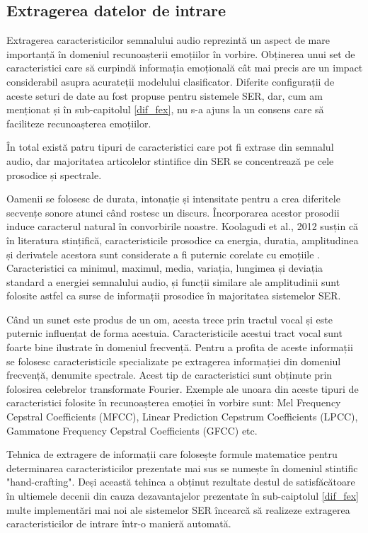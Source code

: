 \documentclass[a4paper,12pt]{book}
\begin{document}
					\subsection{Extragerea datelor de intrare}
						Extragerea caracteristicilor semnalului audio reprezintă un aspect de mare importanță în domeniul recunoașterii emoțiilor în vorbire. Obținerea unui set de caracteristici care să  curpindă informația emoțională cât mai precis are un impact considerabil asupra acurateții modelului clasificator. Diferite configurații de aceste seturi de date au fost propuse pentru sistemele SER, dar, cum am menționat și în sub-capitolul \ref{dif_fex}, nu s-a ajuns la un consens care să faciliteze recunoașterea emoțiilor. \par 
						
						În total există patru tipuri de caracteristici care pot fi extrase din semnalul audio, dar majoritatea articolelor stintifice din SER se concentrează pe cele prosodice și spectrale.\par Oamenii se folosesc de durata, intonație și intensitate pentru a crea diferitele secvențe sonore atunci când rostesc un discurs. Încorporarea acestor prosodii induce caracterul natural în convorbirile noastre. Koolagudi et al., 2012 \cite{koolagudi} susțin că în literatura stințifică, caracteristicile prosodice ca energia, duratia, amplitudinea și derivatele acestora sunt considerate a fi puternic corelate cu emoțiile \cite{dellaert,hcf2,hcf3}. Caracteristici ca minimul, maximul, media, variația, lungimea și deviația standard a energiei semnalului audio, și funcții similare ale amplitudinii sunt folosite astfel ca surse de informații prosodice în majoritatea sistemelor SER. \par Când un sunet este produs de un om, acesta trece prin tractul vocal și este puternic influențat de forma acestuia. Caracteristicile acestui tract vocal sunt foarte bine ilustrate în domeniul frecvență. Pentru a profita de aceste informații se folosesc caracteristicile specializate pe extragerea informației din domeniul frecvență, denumite spectrale. Acest tip de caracteristici sunt obținute prin folosirea celebrelor transformate Fourier. Exemple ale unoara din aceste tipuri de caracteristici folosite în recunoașterea emoției în vorbire sunt: Mel Frequency Cepstral Coefficients (MFCC), Linear Prediction Cepstrum Coefficients (LPCC), Gammatone Frequency Cepstral Coefficients (GFCC) etc. \par 
						
						Tehnica de extragere de informații care folosește formule matematice pentru determinarea caracteristicilor prezentate mai sus se numește în domeniul stintific "hand-crafting". Deși această tehinca a obținut rezultate destul de satisfăcătoare în ultiemele decenii din cauza dezavantajelor prezentate în sub-caiptolul \ref{dif_fex} multe implementări mai noi ale sistemelor SER încearcă să realizeze extragerea caracteristicilor de intrare într-o manieră automată. \par 
						
\end{document}
